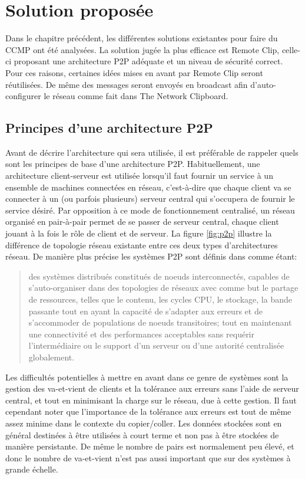 \chapter{Solution proposée}
\renewcommand{\leftmark}{\thechapter.~~Solution proposée}
Dans le chapitre précédent, les différentes solutions existantes pour faire
du CCMP ont été analysées. La solution jugée la plus efficace
est Remote Clip, celle-ci proposant une architecture P2P adéquate et un
niveau de sécurité correct. Pour ces raisons, certaines idées mises en avant
par Remote Clip seront réutilisées. De même des messages seront envoyés en
broadcast afin d'auto-configurer le réseau comme fait dans The Network
Clipboard.

\section{Principes d'une architecture P2P}\label{sec:p2p}
Avant de décrire l'architecture qui sera utilisée, il est préférable
de rappeler quels sont les principes de base d'une architecture P2P.
Habituellement, une architecture client-serveur est utilisée lorsqu'il
faut fournir un service à un ensemble de machines connectées en réseau,
c'est-à-dire que chaque client va se connecter à un (ou parfois plusieurs)
serveur central qui s'occupera de fournir le service désiré. Par opposition à
ce mode de fonctionnement centralisé, un réseau organisé en pair-à-pair
permet de se passer de serveur central, chaque client jouant à la fois le rôle
de client et de serveur. La figure \ref{fig:p2p} illustre la différence
de topologie réseau existante entre ces deux types d'architectures réseau.
De manière plus précise les systèmes P2P sont définis dans \cite{AS04} comme
étant:
\begin{quote}
  des systèmes distribués constitués de noeuds interconnectés, capables de
  s'auto-organiser dans des topologies de réseaux avec comme but le partage
  de ressources, telles que le contenu, les cycles CPU, le stockage,
  la bande passante tout en ayant la capacité de s'adapter aux erreurs et
  de s'accommoder de populations de noeuds transitoires; tout en maintenant
  une connectivité et des performances acceptables sans requérir
  l'intermédiaire ou le support d'un serveur ou d'une autorité
  centralisée globalement.
\end{quote}

Les difficultés potentielles à mettre en avant dans ce genre de systèmes
sont la gestion des va-et-vient de clients et la tolérance aux erreurs
sans l'aide de serveur central, et tout en minimisant la charge sur le réseau,
due à cette gestion. Il faut cependant noter que l'importance de la tolérance
aux erreurs est tout de même assez minime dans le contexte du copier/coller.
Les données stockées sont en général destinées à être utilisées à court terme
et non pas à être stockées de manière persistante. De même le nombre de pairs
est normalement peu élevé, et donc le nombre de va-et-vient n'est pas aussi
important que sur des systèmes à grande échelle.


